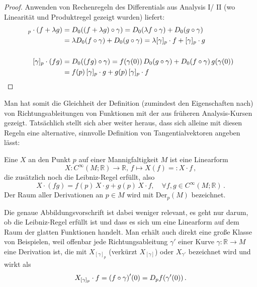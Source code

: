 \documentclass[../H_Analysis_main.tex]{subfiles}
\begin{document}
\begin{proof}
Anwenden von Rechenregeln des Differentials aus Analysis I/ II (wo Linearität und Produktregel gezeigt wurden) liefert:
\begin{align*}
[\gamma]_p \cdot \qty(f + \lambda g) &= D_0 \qty(\qty(f + \lambda g) \circ \gamma) = D_0 \qty(\lambda f \circ \gamma) + D_0 \qty(g \circ \gamma)
\\
&= \lambda D_0 \qty(f \circ \gamma) + D_0 \qty(g \circ \gamma) = \lambda [\gamma]_p \cdot f + [\gamma]_p \cdot g
\\\\
[\gamma]_p \cdot \qty(f g)&= D_0 \qty(\qty(f g) \circ \gamma) = f(\gamma(0)) \, D_0 \qty(g \circ \gamma) + D_0 \qty(f \circ \gamma) \, g(\gamma(0))
\\
&= f(p) \, [\gamma]_p \cdot g + g(p) \, [\gamma]_p \cdot f \qedhere
\end{align*}
\end{proof}

Man hat somit die Gleichheit der Definition (zumindest den Eigenschaften nach) von Richtungsableitungen von Funktionen mit der aus früheren Analysis-Kursen gezeigt. Tatsächlich stellt sich aber weiter heraus, dass sich alleine mit diesen Regeln eine alternative, sinnvolle Definition von Tangentialvektoren angeben lässt:

\begin{defi}[Derivation]
Eine  $X$ an den Punkt $p$ auf einer Mannigfaltigkeit $M$ ist eine Linearform
\begin{equation}
X: C^\infty(M; \mathbb{R}) \rightarrow \mathbb{R}, \, f \mapsto X(f) =: X \cdot f \, ,
\end{equation}
die zusätzlich noch die Leibniz-Regel erfüllt, also
\begin{equation}
X \cdot (fg) = f(p) \, X \cdot g + g(p) \, X \cdot f, \quad \forall f, g \in C^\infty(M; \mathbb{R}) \, .
\end{equation}
Der Raum aller Derivationen an $p \in M$ wird mit $\text{Der}_p(M)$ bezeichnet.
\end{defi}
Die genaue Abbildungsvorschrift ist dabei weniger relevant, es geht nur darum, ob die Leibniz-Regel erfüllt ist und dass es sich um eine Linearform auf dem Raum der glatten Funktionen handelt. Man erhält auch direkt eine große Klasse von Beispielen, weil offenbar jede Richtungsableitung $\gamma'$ einer Kurve $\gamma: \mathbb{R} \rightarrow M$ eine Derivation ist, die mit $X_{[\gamma]_p}$ (verkürzt $X_{[\gamma]}$) oder $X_{\gamma'}$ bezeichnet wird und wirkt als
\begin{equation*}
X_{[\gamma]_p} \cdot f = \qty(f \circ \gamma)'(0) = D_p f \qty(\gamma'(0)) \, .
\end{equation*}
\end{document}
